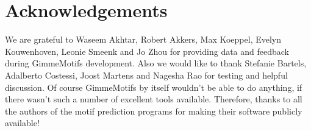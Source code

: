 \documentclass[10pt]{article}
\begin{document}

\section{Acknowledgements}
We are grateful to Waseem Akhtar, Robert Akkers, Max Koeppel, Evelyn Kouwenhoven, Leonie Smeenk and Jo Zhou for providing data and feedback during GimmeMotifs development. Also we would like to thank Stefanie Bartels, Adalberto Costessi, Joost Martens and Nagesha Rao for testing and helpful discussion.
Of course GimmeMotifs by itself wouldn't be able to do anything, if there wasn't such a number of excellent tools available. Therefore, thanks to all the authors of the motif prediction programs for making their software publicly available!



\end{document}
